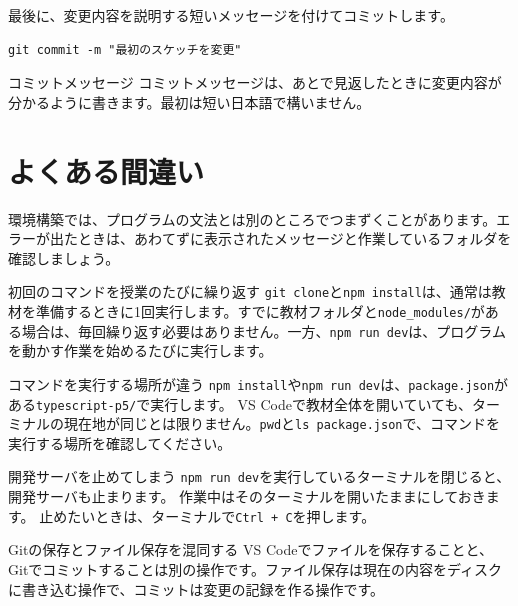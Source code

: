 最後に、変更内容を説明する短いメッセージを付けてコミットします。

\begin{listing}[htbp]
\begin{verbatim}
git commit -m "最初のスケッチを変更"
\end{verbatim}
\caption{Gitで変更を保存するコマンド}
\label{lst:chapter01-git-commit}
\end{listing}

\begin{notebox}{コミットメッセージ}
コミットメッセージは、あとで見返したときに変更内容が分かるように書きます。最初は短い日本語で構いません。
\end{notebox}

\section{よくある間違い}

環境構築では、プログラムの文法とは別のところでつまずくことがあります。エラーが出たときは、あわてずに表示されたメッセージと作業しているフォルダを確認しましょう。

\begin{mistakebox}{初回のコマンドを授業のたびに繰り返す}
\texttt{git clone}と\texttt{npm install}は、通常は教材を準備するときに1回実行します。すでに教材フォルダと\texttt{node\_modules/}がある場合は、毎回繰り返す必要はありません。一方、\texttt{npm run dev}は、プログラムを動かす作業を始めるたびに実行します。
\end{mistakebox}

\begin{mistakebox}{コマンドを実行する場所が違う}
\texttt{npm install}や\texttt{npm run dev}は、\texttt{package.json}がある\texttt{typescript-p5/}で実行します。
VS Codeで教材全体を開いていても、ターミナルの現在地が同じとは限りません。\texttt{pwd}と\texttt{ls package.json}で、コマンドを実行する場所を確認してください。
\end{mistakebox}

\begin{mistakebox}{開発サーバを止めてしまう}
\texttt{npm run dev}を実行しているターミナルを閉じると、開発サーバも止まります。
作業中はそのターミナルを開いたままにしておきます。
止めたいときは、ターミナルで\texttt{Ctrl + C}を押します。
\end{mistakebox}

\begin{mistakebox}{Gitの保存とファイル保存を混同する}
VS Codeでファイルを保存することと、Gitでコミットすることは別の操作です。ファイル保存は現在の内容をディスクに書き込む操作で、コミットは変更の記録を作る操作です。
\end{mistakebox}

